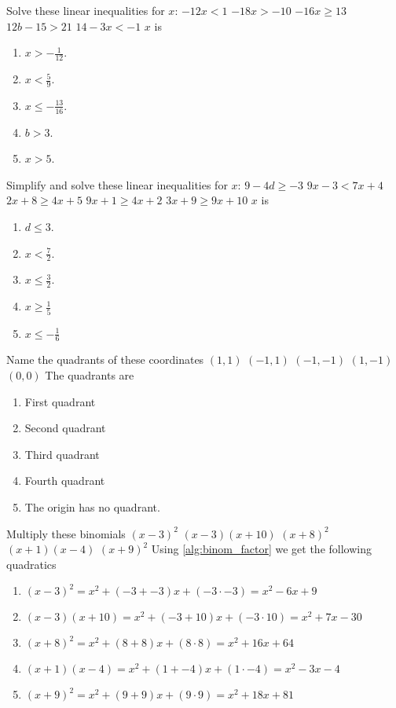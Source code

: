 \begin{ExerciseList}
\Exercise Solve these linear inequalities for $x$:
\Question $-12x < 1$
\Question $-18x > -10$
\Question $−16x \geq 13$
\Question $12b - 15 > 21$
\Question $14 - 3x < -1$
\Answer $x$ is
\begin{enumerate}
\item\myindent $x > -\frac{1}{12}$.
\item\myindent $x < \frac{5}{9}$.
\item\myindent $x \leq -\frac{13}{16}$.
\item\myindent $b>3$.
\item\myindent $x>5$.
\end{enumerate}

\Exercise Simplify and solve these linear inequalities for $x$:
\Question $9 - 4d\geq -3$
\Question $9x - 3 < 7x + 4$
\Question $2x + 8 \geq 4x + 5$
\Question $9x + 1 \geq 4x + 2$
\Question $3x + 9 \geq 9x + 10$
\Answer $x$ is
\begin{enumerate}
\item\myindent $d \leq 3$.
\item\myindent $x < \frac{7}{2}$.
\item\myindent $x \leq \frac{3}{2}$.
\item\myindent $x \geq \frac{1}{5}$
\item\myindent $x \leq -\frac{1}{6}$
\end{enumerate}

\Exercise Name the quadrants of these coordinates
\Question $(1,1)$
\Question $(-1,1)$
\Question $(-1,-1)$
\Question $(1,-1)$
\Question $(0,0)$ 
\Answer The quadrants are
\begin{enumerate}
\item\myindent First quadrant
\item\myindent Second quadrant
\item\myindent Third quadrant
\item\myindent Fourth quadrant
\item\myindent The origin has no quadrant.
\end{enumerate}

\Exercise Multiply these binomials
\Question $(x-3)^2$ 
\Question $(x-3)(x+10)$ 
\Question $(x+8)^2$ 
\Question $(x+1)(x-4)$ 
\Question $(x+9)^2$ 
\Answer Using \ref{alg:binom_factor} we get the following quadratics 
\begin{enumerate}
\item\myindent $(x-3)^2 = x^2 + (-3 + -3)x + (-3 \cdot -3) = x^2 - 6x + 9$
\item\myindent $(x-3)(x+10) = x^2 + (-3 + 10)x + (-3 \cdot 10) = x^2 + 7x - 30$
\item\myindent $(x+8)^2 = x^2 + (8+8)x + (8\cdot8) = x^2 + 16x + 64$
\item\myindent $(x+1)(x-4) = x^2 + (1 + -4)x + (1 \cdot -4) = x^2 - 3x - 4$
\item\myindent $(x+9)^2 = x^2 + (9+9)x + (9\cdot9) = x^2 + 18x + 81$
\end{enumerate}


\end{ExerciseList}
